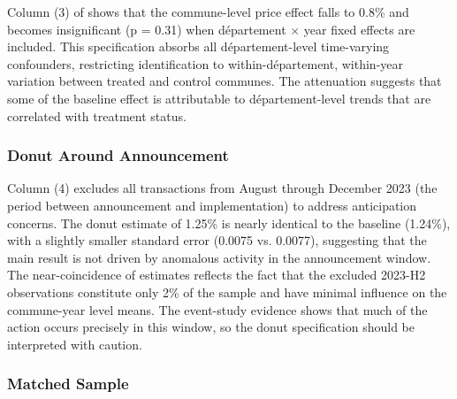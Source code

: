 \documentclass[12pt]{article}
\begin{document}
Column (3) of  shows that the commune-level price effect falls to 0.8\% and becomes insignificant (p = 0.31) when d\'epartement $\times$ year fixed effects are included. This specification absorbs all d\'epartement-level time-varying confounders, restricting identification to within-d\'epartement, within-year variation between treated and control communes. The attenuation suggests that some of the baseline effect is attributable to d\'epartement-level trends that are correlated with treatment status.

\subsubsection{Donut Around Announcement}

Column (4) excludes all transactions from August through December 2023 (the period between announcement and implementation) to address anticipation concerns. The donut estimate of 1.25\% is nearly identical to the baseline (1.24\%), with a slightly smaller standard error (0.0075 vs. 0.0077), suggesting that the main result is not driven by anomalous activity in the announcement window. The near-coincidence of estimates reflects the fact that the excluded 2023-H2 observations constitute only 2\% of the sample and have minimal influence on the commune-year level means. The event-study evidence shows that much of the action occurs precisely in this window, so the donut specification should be interpreted with caution.

\subsubsection{Matched Sample}
\end{document}
